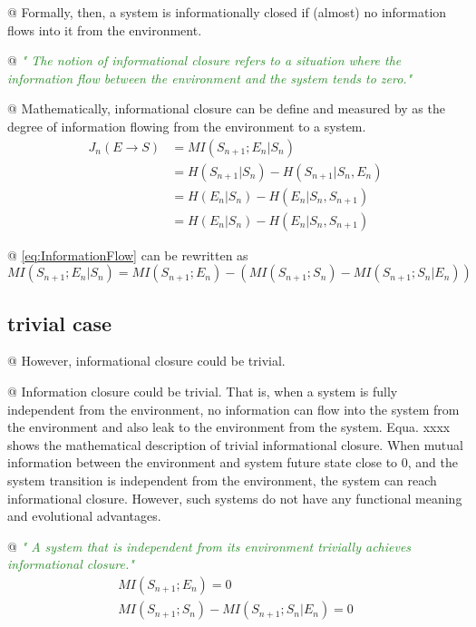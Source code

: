 \documentclass[utf8]{article}
\newenvironment{ants}
			{
			 \begin{easylist}[itemize]
			}
			{
			\end{easylist}
			}
\newcommand{\rewrite}[1]{\textcolor{ForestGreen}{\textit{"#1"}}\newline}
\begin{document}
			
			\begin{ants}				
				@ Formally, then, a system is informationally closed if (almost) no information flows into it from the environment.
				
				@ \rewrite{
					The notion of informational closure refers to a situation where the information flow between the environment and the system tends to zero.} \cite{BERTSCHINGER.2006}
				
				@ Mathematically, informational closure can be define and measured by as the degree of information flowing from the environment to a system.
				\begin{equation}\label{eq:InformationFlow}
				\left.\begin{array}
				{rl}{J_{n}(E \rightarrow S )} & { = MI(S_{n+1};E_{n}|S_{n})} \\
				{ } & { = H(S_{n+1}|S_{n})-H(S_{n+1}|S_{n},E_{n})} \\
				{ } & { = H(E_{n}|S_{n})-H(E_{n}|S_{n},S_{n+1})} \\
				{ } & { = H(E_{n}|S_{n})-H(E_{n}|S_{n},S_{n+1})}
				\end{array}\right.
				\end{equation}
				
				
				@ \ref{eq:InformationFlow} can be rewritten as 
				\begin{equation}
				MI(S_{n+1};E_{n}|S_{n}) = 
				MI(S_{n+1};E_{n}) - (MI(S_{n+1};S_{n})-MI(S_{n+1};S_{n}|E_{n}))
				\end{equation}
				
			\end{ants}
		
		
		
		\subsection*{trivial case}
			\begin{ants}
				@ However, informational closure could be trivial.
				
				@ Information closure could be trivial. That is, when a system is fully independent from the environment, no information can flow into the system from the environment and also leak to the environment from the system. Equa. xxxx shows the mathematical description of trivial informational closure. When mutual information between the environment and system future state close to 0, and the system transition is independent from the environment, the system can reach informational closure. However, such systems do not have any functional meaning and evolutional advantages.
	
				@ \rewrite{
					A system that is independent from its environment trivially achieves informational closure.}  \cite{BERTSCHINGER.2006}
					\begin{equation}
						\left.\begin{array}
						{l}{MI(S_{n+1};E_{n})=0}\\
						{MI(S_{n+1};S_{n})-MI(S_{n+1};S_{n}|E_{n})=0}
						\end{array}\right.
					\end{equation}
			\end{ants}
		
\end{document}
